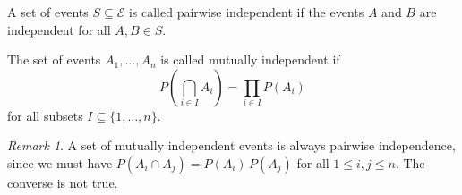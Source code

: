 \documentclass[11pt]{article}
\theoremstyle{definition}
\theoremstyle{remark}
\newtheorem*{remark}{Remark}
\numberwithin{equation}{module}
\begin{document}
    \begin{definition}
        A set of events $S \subseteq \mathcal{E}$ is called pairwise independent if
        the events $A$ and $B$ are independent for all $A, B \in S$.
    \end{definition}

    \begin{definition}
        The set of events $A_1, \dots, A_n$ is called mutually independent
        if \[
            P\left(\bigcap_{i \in I}A_i\right) = \prod_{i \in I} P(A_i)
        \] for all subsets $I \subseteq \{1, \dots, n\}$.
        \begin{remark}
            A set of mutually independent events is always pairwise independence,
            since we must have $P(A_i \cap A_j) = P(A_i)\, P(A_j)$ for all $1 \leq
            i, j \leq n$. The converse is not true.
        \end{remark}
    \end{definition}
\end{document}
